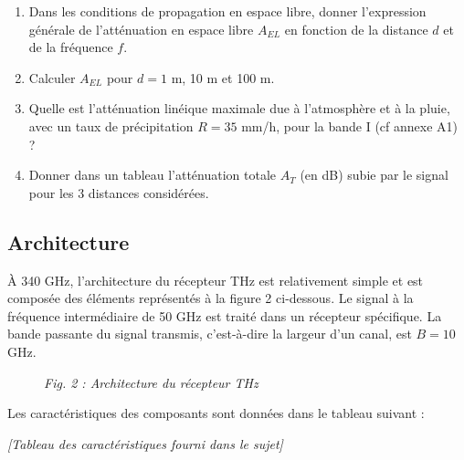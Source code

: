 \documentclass[a4paper,11pt]{article}
\begin{document}
\begin{enumerate}[label=\alph*.]
    \item Dans les conditions de propagation en espace libre, donner l'expression générale de l'atténuation en espace libre $A_{EL}$ en fonction de la distance $d$ et de la fréquence $f$.
    
    \item Calculer $A_{EL}$ pour $d = 1$ m, 10 m et 100 m.
    
    \item Quelle est l'atténuation linéique maximale due à l'atmosphère et à la pluie, avec un taux de précipitation $R = 35$ mm/h, pour la bande I (cf annexe A1) ?
    
    \item Donner dans un tableau l'atténuation totale $A_T$ (en dB) subie par le signal pour les 3 distances considérées.
\end{enumerate}

\subsection{Architecture}

À 340 GHz, l'architecture du récepteur THz est relativement simple et est composée des éléments représentés à la figure 2 ci-dessous. Le signal à la fréquence intermédiaire de 50 GHz est traité dans un récepteur spécifique. La bande passante du signal transmis, c'est-à-dire la largeur d'un canal, est $B = 10$ GHz.

\begin{figure}[h]
    \centering
    \textit{Fig. 2 : Architecture du récepteur THz}
\end{figure}

Les caractéristiques des composants sont données dans le tableau suivant :

\textit{[Tableau des caractéristiques fourni dans le sujet]}
\end{document}
